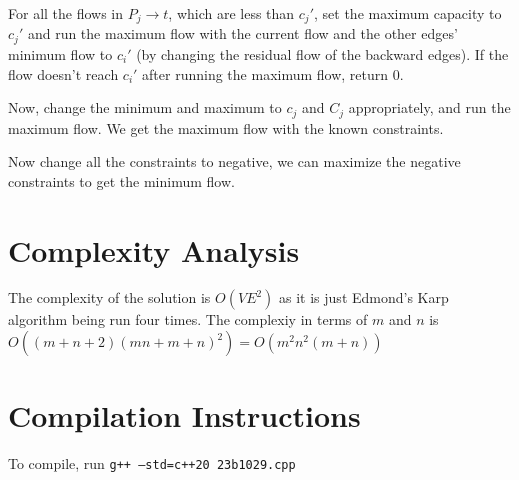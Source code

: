 \documentclass{article}
\begin{document}
For all the flows in $P_j \rightarrow t$, which are less than $c_j'$, set the maximum capacity to $c_j'$ and run the maximum flow with the current flow and the other edges' minimum flow to $c_i'$ (by changing the residual flow of the backward edges). If the flow doesn't reach $c_i'$ after running the maximum flow, return 0.

Now, change the minimum and maximum to $c_j$ and $C_j$ appropriately, and run the maximum flow. We get the maximum flow with the known constraints.

Now change all the constraints to negative, we can maximize the negative constraints to get the minimum flow.

\section{Complexity Analysis}

The complexity of the solution is $O(VE^2)$ as it is just Edmond's Karp algorithm\cite{cpalg-edmonds-karp} being run four times. The complexiy in terms of $m$ and $n$ is $O((m+n+2)(mn+m+n)^2) = O(m^2n^2(m+n))$

\section{Compilation Instructions}

To compile, run \texttt{g++ --std=c++20 23b1029.cpp}

\end{document}
